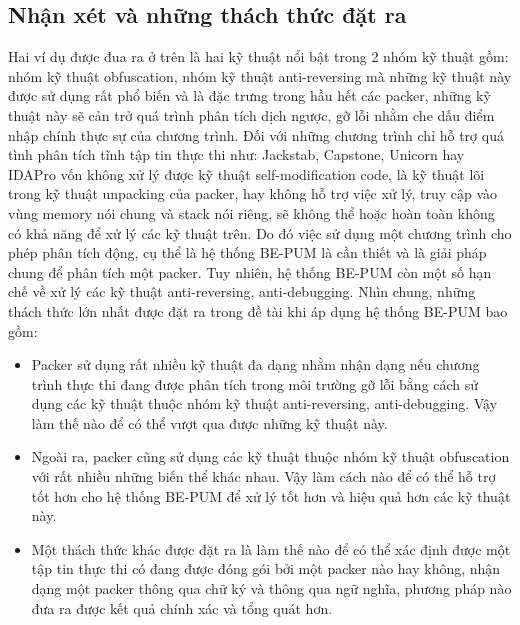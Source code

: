 
\subsection{Nhận xét và những thách thức đặt ra}

\hspace{0.5cm}Hai ví dụ được đua ra ở trên là hai kỹ thuật nổi bật trong 2 nhóm kỹ thuật gồm: nhóm kỹ thuật obfuscation, nhóm kỹ thuật anti-reversing mà những kỹ thuật này được sử dụng rất phổ biến và là đặc trưng trong hầu hết các packer, những kỹ thuật này sẽ cản trở quá trình phân tích dịch ngược, gỡ lỗi nhằm che dấu điểm nhập chính thực sự của chương trình. Đối với những chương trình chỉ hỗ trợ quá tình phân tích tĩnh tập tin thực thi như: Jackstab, Capstone, Unicorn hay IDAPro vốn không xử lý được kỹ thuật self-modification code, là kỹ thuật lõi trong kỹ thuật unpacking của packer, hay không hỗ trợ việc xử lý, truy cập vào vùng memory nói chung và stack nói riêng, sẽ không thể hoặc hoàn toàn không có khả năng để xử lý các kỹ thuật trên. Do đó việc sử dụng một chương trình cho phép phân tích động, cụ thể là hệ thống BE-PUM là cần thiết và là giải pháp chung để phân tích một packer. Tuy nhiên, hệ thống BE-PUM còn một số hạn chế về xử lý các kỹ thuật anti-reversing, anti-debugging. Nhìn chung, những thách thức lớn nhất được đặt ra trong đề tài khi áp dụng hệ thống BE-PUM bao gồm:

\begin{itemize}
\item{Packer sử dụng rất nhiều kỹ thuật đa dạng nhằm nhận dạng nếu chương trình thực thi đang được phân tích trong môi trường gỡ lỗi bằng cách sử dụng các kỹ thuật thuộc nhóm kỹ thuật anti-reversing, anti-debugging. Vậy làm thế nào để có thể vượt qua được những kỹ thuật này.\\}
\item{Ngoài ra, packer cũng sử dụng các kỹ thuật thuộc nhóm kỹ thuật obfuscation với rất nhiều những biến thể khác nhau. Vậy làm cách nào để có thể hỗ trợ tốt hơn cho hệ thống BE-PUM để xử lý tốt hơn và hiệu quả hơn các kỹ thuật này.\\}
\item{Một thách thức khác được đặt ra là làm thế nào để có thể xác định được một tập tin thực thi có đang được đóng gói bởi một packer nào hay không, nhận dạng một packer thông qua chữ ký và thông qua ngữ nghĩa, phương pháp nào đưa ra được kết quả chính xác và tổng quát hơn.}
\end{itemize}

